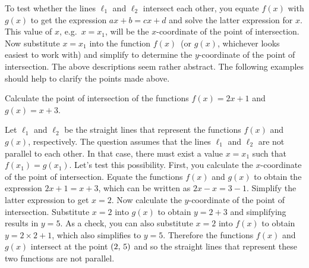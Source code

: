 \documentclass[a4paper,oneside,12pt]{article}
\begin{document}
To test whether the lines $\ell_1$ and $\ell_2$ intersect each other,
you equate $f(x)$ with $g(x)$ to get the expression $ax + b = cx + d$
and solve the latter expression for $x$.  This value of $x$,
e.g.~$x = x_1$, will be the $x$-coordinate of the point of
intersection.  Now substitute $x = x_1$ into the function $f(x)$~(or
$g(x)$, whichever looks easiest to work with) and simplify to
determine the $y$-coordinate of the point of intersection.  The above
descriptions seem rather abstract.  The following examples should help
to clarify the points made above.

\begin{example}
\label{ex:intersection_2x_plus_1_x_plus_3}
Calculate the point of intersection of the functions $f(x) = 2x + 1$
and $g(x) = x + 3$.
\end{example}

\begin{solution}
Let $\ell_1$ and $\ell_2$ be the straight lines that represent the
functions $f(x)$ and $g(x)$, respectively.  The question assumes that
the lines $\ell_1$ and $\ell_2$ are not parallel to each other.  In
that case, there must exist a value $x = x_1$ such that
$f(x_1) = g(x_1)$.  Let's test this possibility.  First, you calculate
the $x$-coordinate of the point of intersection.  Equate the functions
$f(x)$ and $g(x)$ to obtain the expression $2x + 1 = x + 3$, which can
be written as $2x - x = 3 - 1$.  Simplify the latter expression to get
$x = 2$.  Now calculate the $y$-coordinate of the point of
intersection.  Substitute $x = 2$ into $g(x)$ to obtain $y = 2 + 3$
and simplifying results in $y = 5$.  As a check, you can also
substitute $x = 2$ into $f(x)$ to obtain $y = 2 \times 2 + 1$, which
also simplifies to $y = 5$.  Therefore the functions $f(x)$ and $g(x)$
intersect at the point $\left\lparen{2},\, {5}\right\rparen$ and so the straight lines that
represent these two functions are not parallel.
\end{solution}
\end{document}
